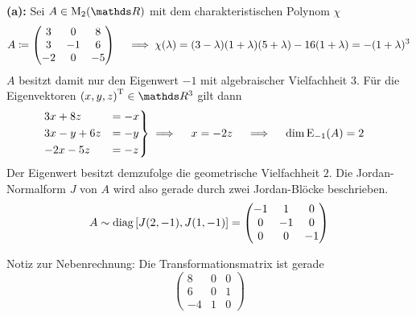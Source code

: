 		\textbf{(a):}
		Sei $A\in\m{M}_2(\SR)$ mit dem charakteristischen Polynom $\chi$
		\[
			A \coloneqq
			\begin{pmatrix}
				3 & 0 & 8 \\
				3 & -1 & 6 \\
				-2 & 0 & -5
			\end{pmatrix}
			\quad \implies \chi(\lambda) = (3-\lambda)(1+\lambda)(5+\lambda) - 16(1+\lambda) = -(1+\lambda)^3
		\]
		$A$ besitzt damit nur den Eigenwert $-1$ mit algebraischer Vielfachheit $3$.
		Für die Eigenvektoren $\transp{(x,y,z)}\in\SR^3$ gilt dann
		\begin{alignat*}{3}
			&\! \begin{drcases}
			3x + 8z &= -x \\
			3x - y + 6z &= -y \\
			-2x - 5z &= -z
			\end{drcases}
			\implies \quad x=-2z \quad \implies \quad \dim \m{E}_{-1}(A) = 2
		\end{alignat*}
		Der Eigenwert besitzt demzufolge die geometrische Vielfachheit $2$.
		Die Jordan-Normalform $J$ von $A$ wird also gerade durch zwei Jordan-Blöcke beschrieben.
		\[
			A\sim \operatorname{diag}\left[  J(2,-1), J(1,-1)  \right] =
			\begin{pmatrix}
				-1 & 1 & 0 \\
				0 & -1 & 0 \\
				0 & 0 & -1
			\end{pmatrix}
		\]

		Notiz zur Nebenrechnung:
		Die Transformationsmatrix ist gerade
		\[
			\begin{pmatrix}
				8 & 0 & 0 \\
				6 & 0 & 1 \\
				-4 & 1 & 0
			\end{pmatrix}
		\]


